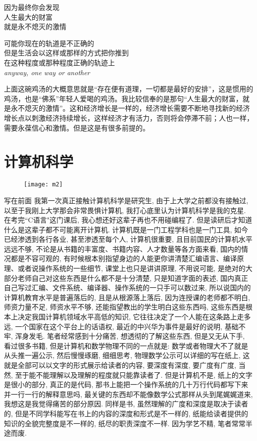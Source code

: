 \documentclass[utf8]{book}
\begin{document}
\begin{center}
		因为最终你会发现\\
		人生最大的财富\\
		就是永不熄灭的激情
		
		可能你现在的轨道是不正确的\\
		但是生活会以这样或那样的方式把你推到\\
		在这种程度或那种程度正确的轨迹上\\
		\textit{anyway, one way or another}
	\end{center}

	上面这碗鸡汤的大概意思就是“存在便有道理，一切都是最好的安排”，这是惯用的鸡汤，也是“佛系”年轻人爱喝的鸡汤。我比较信奉的是那句“人生最大的财富，就是永不熄灭的激情”。这和经济增长是一样的，经济增长需要不断地寻找新的经济增长点以刺激经济持续增长，这样经济才有活力，否则将会停滞不前；人也一样，需要永葆信心和激情。但是这是有很多前提的。

\part{计算机科学}

	\begin{figure}[H]
	\centering
	\texttt{[image: m2]}
    \end{figure}

	{\huge 写在前面} 我第一次真正接触计算机科学是研究生, 由于上大学之前都没有接触过, 以至于我刚上大学那会非常畏惧计算机, 我打心底里认为计算机科学是我的克星. 在考完``C语言"这门课后, 我心想还好这辈子再也不用碰编程了. 但是读研后才知道什么是这辈子都不可能离开计算机. 计算机既是一门工程学科也是一门工具, 如今已经渗透到各行各业, 甚至渗透至每个人, 计算机很重要, 且目前国民的计算机水平远远不够, 不论是从书籍的丰富度、书籍内容、人才数量等各方面来看, 国内的情况都是不容可观的, 有时候根本别指望身边的人能更你讲清楚汇编语言、编译原理、或者说操作系统的一些细节, 课堂上也只是讲讲原理, 不用说可能, 是绝对的大部分老师自己对这些东西是什么都不是十分清楚, 只是知道字面的表述, 国内真正自己写过汇编、文件系统、编译器、操作系统的一只手可以数过来, 所以说国内的计算机教育水平是普遍落后的, 且是从根源落上落后, 因为连授课的老师都不明白, 师资力量不足, 师资水平不够, 还能指望教出的学生明白这些东西吗, 这些东西是根本上决定我国计算机领域水平高低的知识, 它往往决定了一个人能在这条路上走多远, 一个国家在这个平台上的话语权, 最近的中兴华为事件是最好的说明, 基础不牢, 浑身发毛. 笔者经常感到十分痛苦, 想透彻的了解这些东西, 但是又无从下手, 看过很多书籍, 但是计算机和数学物理不同的一点就是: 数学或者物理大不了就是从头推一遍公示, 然后慢慢琢磨, 细细思考, 物理数学公示可以详细的写在纸上, 这就是全部可以以文字的形式展示给读者的内容, 要深度有深度, 要广度有广度, 当然, 至于能不能理解以及理解的程度就只能靠读者了. 但是计算机不是, 纸上的文字是很小的部分, 真正的是代码, 那书上能把一个操作系统的几十万行代码都写下来并一行一行的解释意思吗, 最关键的东西却不能像数学公式那样从头到尾娓娓道来, 我想这是我觉得痛苦的部分原因. 同样是书, 虽然理解的广度和深度是取决于读者的, 但是不同学科能写在书上的内容的深度和形式是不一样的, 纸能给读者提供的知识的全貌完整度是不一样的, 纸尽的职责深度不一样. 因为学艺不精, 笔者常常半途而废.
	
\end{document}
